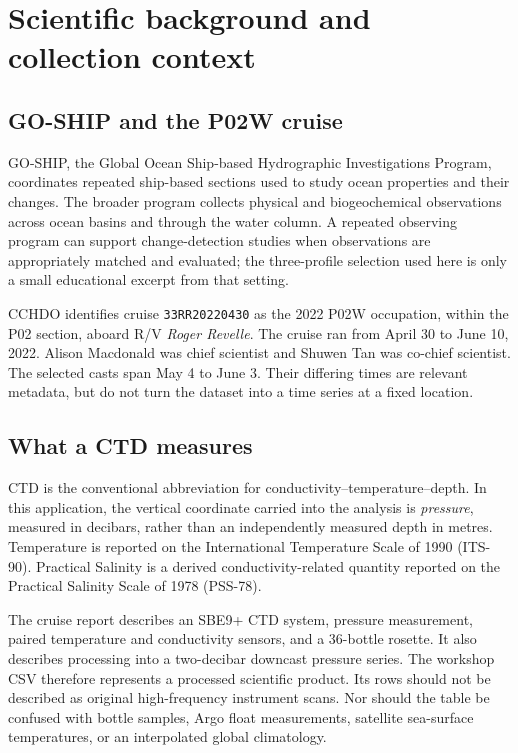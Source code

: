 \documentclass[11pt,letterpaper]{article}
\newcommand{\field}[1]{\nolinkurl{#1}}
\begin{document}
\section{Scientific background and collection context}

\subsection{GO-SHIP and the P02W cruise}
GO-SHIP, the Global Ocean Ship-based Hydrographic Investigations Program, coordinates repeated ship-based sections used to study ocean properties and their changes. The broader program collects physical and biogeochemical observations across ocean basins and through the water column. A repeated observing program can support change-detection studies when observations are appropriately matched and evaluated; the three-profile selection used here is only a small educational excerpt from that setting.\cite{goship}

CCHDO identifies cruise \field{33RR20220430} as the 2022 P02W occupation, within the P02 section, aboard R/V \emph{Roger Revelle}. The cruise ran from April 30 to June 10, 2022. Alison Macdonald was chief scientist and Shuwen Tan was co-chief scientist.\cite{cruise} The selected casts span May 4 to June 3. Their differing times are relevant metadata, but do not turn the dataset into a time series at a fixed location.

\subsection{What a CTD measures}
CTD is the conventional abbreviation for conductivity--temperature--depth. In this application, the vertical coordinate carried into the analysis is \emph{pressure}, measured in decibars, rather than an independently measured depth in metres. Temperature is reported on the International Temperature Scale of 1990 (ITS-90). Practical Salinity is a derived conductivity-related quantity reported on the Practical Salinity Scale of 1978 (PSS-78).

The cruise report describes an SBE9+ CTD system, pressure measurement, paired temperature and conductivity sensors, and a 36-bottle rosette. It also describes processing into a two-decibar downcast pressure series.\cite{cruisereport} The workshop CSV therefore represents a processed scientific product. Its rows should not be described as original high-frequency instrument scans. Nor should the table be confused with bottle samples, Argo float measurements, satellite sea-surface temperatures, or an interpolated global climatology.
\end{document}
